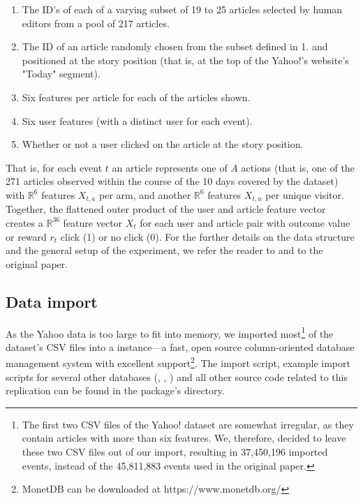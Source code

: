\documentclass{jss}
\begin{document}
\begin{enumerate}
         \item The ID's of each of a varying subset of 19 to 25 articles selected by human editors from a pool of 217 articles.
         \item The ID of an article randomly chosen from the subset defined in 1. and positioned at the story position (that is, at the top of the Yahoo!'s website's "Today" segment).
         \item Six features per article for each of the articles shown.
         \item Six user features (with a distinct user for each event).
         \item Whether or not a user clicked on the article at the story position.
\end{enumerate}

That is, for each event $t$ an article represents one of $A$ actions (that is, one of the 271 articles observed within the course of the 10 days covered by the dataset) with $\mathbb{R}^6$ features $X_{t,a}$ per arm, and another $\mathbb{R}^6$ features $X_{t,u}$ per unique visitor. Together, the flattened outer product of the user and article feature vector creates a $\mathbb{R}^{36}$ feature vector $X_t$ for each user and article pair with outcome value or reward $r_t$ click (1) or no click (0). For the further details on the data structure and the general setup of the experiment, we refer the reader to \cite{Chu2009} and to the original \cite{Li2010} paper.

\subsection{Data import} \label{dataimp}

As the Yahoo data is too large to fit into memory, we imported most\footnote{The first two CSV files of the Yahoo! dataset are somewhat irregular, as they contain articles with more than six features. We, therefore, decided to leave these two CSV files out of our import, resulting in 37,450,196 imported events, instead of the 45,811,883 events used in the original paper.} of the dataset's CSV files into a  \citep{IdreosGNMMK12} instance---a fast, open source column-oriented database management system with excellent  support\footnote{MonetDB can be downloaded at https://www.monetdb.org/}. The import script, example import scripts for several other databases (, , ) and all other source code related to this replication can be found in the package's  directory.
\end{document}
